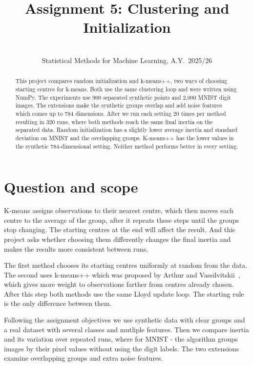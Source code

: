 \documentclass[11pt,a4paper]{article}
\title{\vspace{-1.2cm}Assignment 5: Clustering and Initialization}
\author{\studentname\\
\normalsize Statistical Methods for Machine Learning, A.Y.\ 2025/26}
\date{}
\begin{document}
\maketitle
\vspace{-0.7cm}

\begin{abstract}
This project compares random initialization and k-means++, two ways of choosing starting centres for k-means. Both use the same clustering loop and were written using NumPy. The experiments use 900 separated synthetic points and 2,000 MNIST digit images. The extensions make the synthetic groups overlap and add noise features which comes up to 784 dimensions. After we run each setting 20 times per method resulting in 320 runs, where both methods reach the same final inertia on the separated data. Random initialization has a slightly lower average inertia and standard deviation on MNIST and the overlapping groups. K-means++ has the lower values in the synthetic 784-dimensional setting. Neither method performs better in every setting.
\end{abstract}

\section{Question and scope}

K-means assigns observations to their nearest centre, which then moves each centre to the average of the group, after it repeats these steps until the groups stop changing. The starting centres at the end will affect the result. And this project asks whether choosing them differently changes the final inertia and makes the results more consistent between runs.

The first method chooses its starting centres uniformly at random from the data. The second uses k-means++ which was proposed by Arthur and Vassilvitskii~\cite{arthur2007}, which gives more weight to observations farther from centres already chosen. After this step both methods use the same Lloyd update loop. The starting rule is the only difference between them.

Following the assignment objectives we use synthetic data with clear groups and a real dataset with several classes and mutliple features. Then we compare inertia and its variation over repeated runs, where for MNIST - the algorithm groups images by their pixel values without using the digit labels. The two extensions examine overlapping groups and extra noise features.
\end{document}
